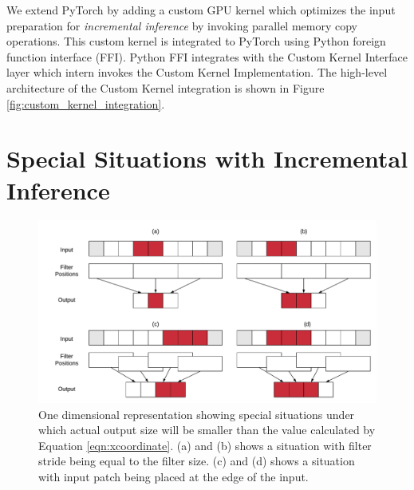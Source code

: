 We extend PyTorch by adding a custom GPU kernel which optimizes the input preparation for \textit{incremental inference} by invoking parallel memory copy operations.
This custom kernel is integrated to PyTorch using Python foreign function interface (FFI).
Python FFI integrates with the Custom Kernel Interface layer which intern invokes the Custom Kernel Implementation.
The high-level architecture of the Custom Kernel integration is shown in Figure \ref{fig:custom_kernel_integration}.


\section{Special Situations with Incremental Inference}

\begin{figure}[t]
\includegraphics[width=\columnwidth]{images/less_one_example}
\caption{One dimensional representation showing special situations under which actual output size will be smaller than the value calculated by Equation \ref{eqn:xcoordinate}. (a) and (b) shows a situation with filter stride being equal to the filter size. (c) and (d) shows a situation with input patch being placed at the edge of the input.}
\label{fig:less_one_example}
\end{figure}


